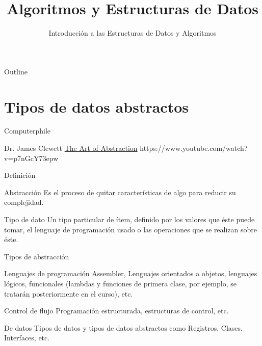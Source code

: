 \documentclass[aspectratio=169]{beamer}
\title{Algoritmos y Estructuras de Datos}
\subtitle{Introducción a las Estructuras de Datos y Algoritmos}
\date{\the\year}
\institute{\href{http://www.upc.edu.pe}{Universidad Peruana de Ciencias Aplicadas}}
\begin{document}
\maketitle

\begin{frame}{Outline}
	\tableofcontents
\end{frame}

\section{Tipos de datos abstractos}

\begin{frame}{Computerphile}
\begin{block}{Dr. James Clewett}
\href{https://www.youtube.com/watch?v=p7nGcY73epw}{The Art of Abstraction}
https://www.youtube.com/watch?v=p7nGcY73epw
\end{block}
\end{frame}

\begin{frame}{Definición}
\begin{block}{Abstracción}
Es el proceso de quitar características de algo para reducir su complejidad.
\end{block}
\begin{block}{Tipo de dato}
Un tipo particular de ítem, definido por los valores que éste puede tomar, el lenguaje de programación usado o las operaciones que se realizan sobre éste.
\end{block}
\end{frame}

\begin{frame}{Tipos de abstracción}
\begin{block}{Lenguajes de programación}
Assembler, Lenguajes orientados a objetos, lenguajes lógicos, funcionales (lambdas y funciones de primera clase, por ejemplo, se tratarán posteriormente en el curso), etc.
\end{block}
\begin{block}{Control de flujo}
Programación estructurada, estructuras de control, etc.
\end{block}
\begin{block}{De datos}
Tipos de datos y tipos de datos abstractos como Registros, Clases, Interfaces, etc.
\end{block}
\end{frame}

\end{document}
